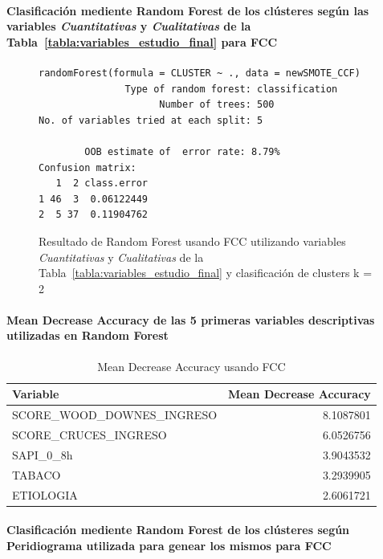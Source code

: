 \paragraph{Clasificación mediente Random Forest de los clústeres según las variables \textit{Cuantitativas} y \textit{Cualitativas} de la Tabla~\ref{tabla:variables_estudio_final} para FCC}

\begin{figure}[H]
    \centering
    \begin{lstlisting}[frame=single, basicstyle=\small\ttfamily]
        randomForest(formula = CLUSTER ~ ., data = newSMOTE_CCF) 
               Type of random forest: classification
                     Number of trees: 500
No. of variables tried at each split: 5

        OOB estimate of  error rate: 8.79%
Confusion matrix:
   1  2 class.error
1 46  3  0.06122449
2  5 37  0.11904762
    \end{lstlisting}
    \caption{Resultado de Random Forest usando FCC utilizando variables \textit{Cuantitativas} y \textit{Cualitativas} de la Tabla~\ref{tabla:variables_estudio_final} y clasificación de clusters k = 2}\label{fig:random_forest_ccf_result_1}
\end{figure}

\paragraph{Mean Decrease Accuracy de las 5 primeras variables descriptivas utilizadas en Random Forest}

\begin{table}[H]
    \centering
    \begin{tabular}{lr}
        \toprule
        \textbf{Variable} & \textbf{Mean Decrease Accuracy} \\
        \midrule
        SCORE\_WOOD\_DOWNES\_INGRESO & 8.1087801 \\
        SCORE\_CRUCES\_INGRESO & 6.0526756 \\
        SAPI\_0\_8h & 3.9043532 \\
        TABACO & 3.2939905 \\
        ETIOLOGIA & 2.6061721 \\
        \bottomrule
    \end{tabular}
    \caption{Mean Decrease Accuracy usando FCC}
\end{table}

\paragraph{Clasificación mediente Random Forest de los clústeres según Peridiograma utilizada para genear los mismos para FCC} 


